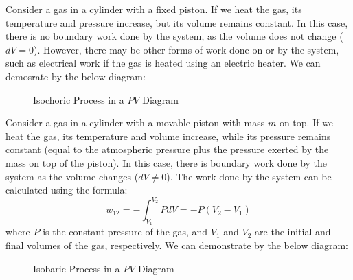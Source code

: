 \documentclass[11pt]{report}
\begin{document}
\begin{example}
    Consider a gas in a cylinder with a fixed piston. If we heat the gas, its temperature and pressure increase, but its volume remains constant. In this case, there is no boundary work done by the system, as the volume does not change ($dV = 0$). However, there may be other forms of work done on or by the system, such as electrical work if the gas is heated using an electric heater. We can demosrate by the below diagram:
    \begin{figure}[h!]
        \centering
        \caption{Isochoric Process in a $PV$ Diagram}
    \end{figure}
    
\end{example}

\begin{example}
    Consider a gas in a cylinder with a movable piston with mass $m$ on top. If we heat the gas, its temperature and volume increase, while its pressure remains constant (equal to the atmospheric pressure plus the pressure exerted by the mass on top of the piston). In this case, there is boundary work done by the system as the volume changes ($dV \neq 0$). The work done by the system can be calculated using the formula:
    \begin{equation}
        w_{12} = -\int_{V_1}^{V_2} P dV = -P (V_2 - V_1)
    \end{equation}
    where $P$ is the constant pressure of the gas, and $V_1$ and $V_2$ are the initial and final volumes of the gas, respectively. We can demonstrate by the below diagram:
    \begin{figure}[h!]
        \centering
        \caption{Isobaric Process in a $PV$ Diagram}
    \end{figure}
\end{example}
\end{document}
